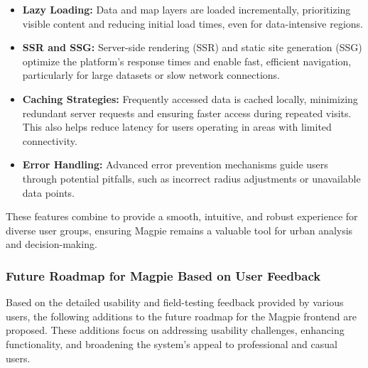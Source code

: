 \begin{enumerate}
\begin{enumerate}
        \begin{itemize}
            \item \textbf{Lazy Loading:} Data and map layers are loaded incrementally, prioritizing visible content and reducing initial load times, even for data-intensive regions.
            \item \textbf{SSR and SSG:} Server-side rendering (SSR) and static site generation (SSG) optimize the platform’s response times and enable fast, efficient navigation, particularly for large datasets or slow network connections.
            \item \textbf{Caching Strategies:} Frequently accessed data is cached locally, minimizing redundant server requests and ensuring faster access during repeated visits. This also helps reduce latency for users operating in areas with limited connectivity.
            \item \textbf{Error Handling:} Advanced error prevention mechanisms guide users through potential pitfalls, such as incorrect radius adjustments or unavailable data points.
        \end{itemize}
        These features combine to provide a smooth, intuitive, and robust experience for diverse user groups, ensuring Magpie remains a valuable tool for urban analysis and decision-making.
    \end{enumerate}

\end{enumerate}

\subsubsection{Future Roadmap for Magpie Based on User Feedback}
Based on the detailed usability and field-testing feedback provided by various users, the following additions to the future roadmap for the Magpie frontend are proposed. These additions focus on addressing usability challenges, enhancing functionality, and broadening the system’s appeal to professional and casual users.

